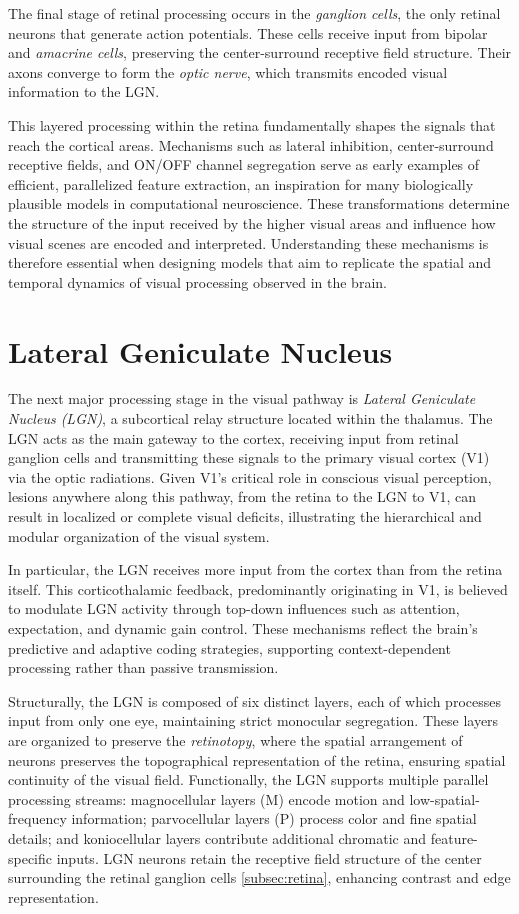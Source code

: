 The final stage of retinal processing occurs in the \emph{ganglion cells}, the only retinal neurons that generate action potentials. These cells receive input from bipolar and \emph{amacrine cells}, preserving the center-surround receptive field structure. Their axons converge to form the \emph{optic nerve}, which transmits encoded visual information to the LGN.

This layered processing within the retina fundamentally shapes the signals that reach the cortical areas. Mechanisms such as lateral inhibition, center-surround receptive fields, and ON/OFF channel segregation serve as early examples of efficient, parallelized feature extraction, an inspiration for many biologically plausible models in computational neuroscience. These transformations determine the structure of the input received by the higher visual areas and influence how visual scenes are encoded and interpreted. Understanding these mechanisms is therefore essential when designing models that aim to replicate the spatial and temporal dynamics of visual processing observed in the brain.

\section{Lateral Geniculate Nucleus}
\label{sec:lgn}
The next major processing stage in the visual pathway is \emph{Lateral Geniculate Nucleus (LGN)}, a subcortical relay structure located within the thalamus. The LGN acts as the main gateway to the cortex, receiving input from retinal ganglion cells and transmitting these signals to the primary visual cortex (V1) via the optic radiations. Given V1's critical role in conscious visual perception, lesions anywhere along this pathway, from the retina to the LGN to V1, can result in localized or complete visual deficits, illustrating the hierarchical and modular organization of the visual system.

In particular, the LGN receives more input from the cortex than from the retina itself. This corticothalamic feedback, predominantly originating in V1, is believed to modulate LGN activity through top-down influences such as attention, expectation, and dynamic gain control. These mechanisms reflect the brain's predictive and adaptive coding strategies, supporting context-dependent processing rather than passive transmission.

Structurally, the LGN is composed of six distinct layers, each of which processes input from only one eye, maintaining strict monocular segregation. These layers are organized to preserve the \emph{retinotopy}, where the spatial
arrangement of neurons preserves the topographical representation of the retina, ensuring spatial continuity of the visual field. Functionally, the LGN supports multiple parallel processing streams: magnocellular layers (M) encode motion and low-spatial-frequency information; parvocellular layers (P) process color and fine spatial details; and koniocellular layers contribute additional chromatic and feature-specific inputs. LGN neurons retain the receptive field structure of the center surrounding the retinal ganglion cells \ref{subsec:retina}, enhancing contrast and edge representation.

